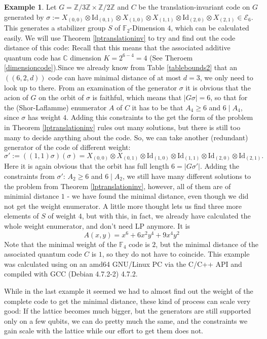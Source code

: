 \documentclass[12pt,a4paper,BCOR15mm,twoside,DIV12]{article}
\def\E{\mathcal{E}}
\def\Z{\mathbb{Z}}
\def\F{\mathbb{F}}
\def\C{\mathbb{C}}
\def\Id{\text{Id}}
\theoremstyle{definition}
\newtheorem{ex}[Satz]{Example}
\begin{document}
\begin{ex}
Let $G = \Z/3\Z \times \Z/2\Z$ and $C$ be the translation-invariant code on $G$ generated by $\sigma:= X_{(0,0)} \otimes \Id_{(0,1)} \otimes X_{(1,0)} \otimes X_{(1,1)} \otimes \Id_{(2,0)} \otimes X_{(2,1)} \in \E_6$. This generates a stabilizer group $S$ of $\F_2$-Dimension $4$,
 which can be calculated easily. We will use Theorem \ref{lptranslationinv} to try and find out the code distance of this code:
Recall that this means that the associated additive quantum code has $\C$ dimension $K=2^{6-4} = 4$ (See Theroem \ref{dimensioncode}).Since we already know from Table \ref{tablebounds2} that an $((6,2,d))$ code can have minimal distance of at most $d=3$, we only need to look up to there.
From an examination of the generator $\sigma$  it is obvious that the acion of $G$ on the orbit of $\sigma$ is faithful, which means that $|G \sigma| = 6$, so
that for the (Shor-Laflamme) enumerator $A$ of $C$ it has to be that $A_4 \geq 6$ and $6 \mid A_4$, since $\sigma$ has weight $4$. Adding this constraints to the get the form of the problem in Theorem \ref{lptranslationinv}
rules out many solutions, but there is still too many to decide anything about the code. So, we can take another (redundant) generator of the code of different weight:
\[ \sigma':= ((1,1)\sigma )(\sigma) =  X_{(0,0)} \otimes X_{(0,1)} \otimes \Id_{(1,0)} \otimes \Id_{(1,1)} \otimes \Id_{(2,0)} \otimes \Id_{(2,1)}. \]
Here it is again obvious that the orbit has full length $6 = |G\sigma'|$. Adding the constraints from $\sigma'$: $A_2 \geq 6$ and $6 \mid A_2$,
we still have many different solutions to the problem from Theorem \ref{lptranslationinv}, however, all of them are of minimial distance $1$ - we have found the minimal distance, even though we did not get the weight enumerator. 
A little more thought lets us find three more elements of $S$ of weight $4$, but with this, in fact, we already have calculated the whole weight enumerator, and don't need LP anymore. It is
\begin{equation}
A(x,y) = x^6 + 6 x^2y^4 + 9 x^4y^2 
\end{equation}
Note that the minimal weight of the $\F_4$ code is $2$, but the minimal distance of the associated quantum code $C$ is $1$, so they do not have to coincide.
This example was calculated using \cite{lp_solve} on an amd64 GNU/Linux PC via the C/C++ API and compiled with GCC (Debian 4.7.2-2) 4.7.2. 
\end{ex}

While in the last example it seemed we had to almost find out the weight of the complete code to get the minimal distance, these kind of process can scale very good: If the lattice becomes much bigger, 
but the generators are still supported only on a few qubits, we can do pretty much the same, and the constraints we gain scale with the lattice while our effort to get them does not. 
\end{document}
